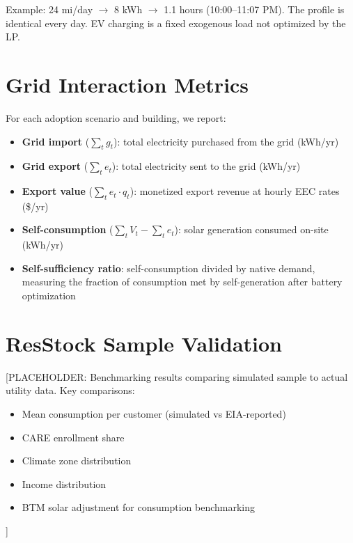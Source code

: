 \documentclass[9pt]{article}
\begin{document}
Example: 24 mi/day $\rightarrow$ 8 kWh $\rightarrow$ 1.1 hours (10:00--11:07 PM). The profile is identical every day. EV charging is a fixed exogenous load not optimized by the LP.

\section{Grid Interaction Metrics}
\label{sec:grid_metrics}

For each adoption scenario and building, we report:

\begin{itemize}
\item \textbf{Grid import} ($\sum_t g_t$): total electricity purchased from the grid (kWh/yr)
\item \textbf{Grid export} ($\sum_t e_t$): total electricity sent to the grid (kWh/yr)
\item \textbf{Export value} ($\sum_t e_t \cdot q_t$): monetized export revenue at hourly EEC rates (\$/yr)
\item \textbf{Self-consumption} ($\sum_t V_t - \sum_t e_t$): solar generation consumed on-site (kWh/yr)
\item \textbf{Self-sufficiency ratio}: self-consumption divided by native demand, measuring the fraction of consumption met by self-generation after battery optimization
\end{itemize}

\section{ResStock Sample Validation}
\label{sec:validation}

[PLACEHOLDER: Benchmarking results comparing simulated sample to actual utility data. Key comparisons:
\begin{itemize}
\item Mean consumption per customer (simulated vs EIA-reported)
\item CARE enrollment share
\item Climate zone distribution
\item Income distribution
\item BTM solar adjustment for consumption benchmarking
\end{itemize}
]
\end{document}
